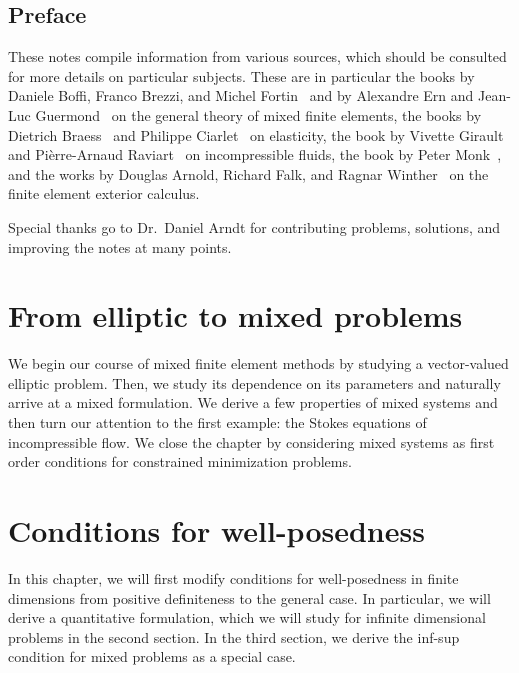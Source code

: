 
\maketitle

\section*{Preface}
%

These notes compile information from various sources, which should be
consulted for more details on particular subjects. These are in
particular the books by Daniele Boffi, Franco Brezzi, and Michel
Fortin~\cite{BoffiBrezziFortin13} and by Alexandre Ern and Jean-Luc
Guermond~\cite{ErnGuermond04} on the general theory of mixed finite
elements, the books by Dietrich Braess~\cite{Braess97,Braess13} and
Philippe Ciarlet~\cite{Ciarlet88} on elasticity, the book by Vivette
Girault and Pièrre-Arnaud Raviart~\cite{GiraultRaviart86} on
incompressible fluids, the book by Peter Monk~\cite{Monk03}, and the
works by Douglas Arnold, Richard Falk, and Ragnar
Winther~\cite{ArnoldFalkWinther06acta,ArnoldFalkWinther10} on the
finite element exterior calculus.

Special thanks go to Dr.~Daniel Arndt for contributing problems,
solutions, and improving the notes at many points.
\thispagestyle{empty}
\setcounter{page}{0}


\tableofcontents

\chapter{From elliptic to mixed problems}
We begin our course of mixed finite element methods by studying a
vector-valued elliptic problem. Then, we study its dependence on its
parameters and naturally arrive at a mixed formulation. We derive a
few properties of mixed systems and then turn our attention to the
first example: the Stokes equations of incompressible flow. We close
the chapter by considering mixed systems as first order conditions
for constrained minimization problems.




\chapter{Conditions for well-posedness}
\label{sec:mixed-wellposedness}
In this chapter, we will first modify conditions for well-posedness in
finite dimensions from positive definiteness to the general case. In
particular, we will derive a quantitative formulation, which we will
study for infinite dimensional problems in the second section. In the
third section, we derive the inf-sup condition for mixed problems as a
special case.



